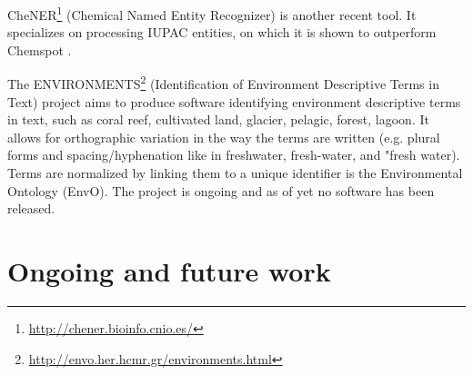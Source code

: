 \documentclass[11pt,oneside,a4paper]{report}
\begin{document}
CheNER\footnote{\url{http://chener.bioinfo.cnio.es/}} (Chemical Named Entity Recognizer) is another recent tool. It specializes on processing IUPAC entities, on which it is shown to outperform Chemspot \citep{Usie2014CheNER}.

The ENVIRONMENTS\footnote{\url{http://envo.her.hcmr.gr/environments.html}} (Identification of Environment Descriptive Terms in Text) project aims to produce software identifying environment descriptive terms in text, such as coral reef, cultivated land, glacier, pelagic, forest, lagoon.
It allows for orthographic variation in the way the terms are written (e.g. plural forms and spacing/hyphenation like in freshwater, fresh-water, and "fresh water).
Terms are normalized by linking them to a unique identifier is the Environmental Ontology (EnvO).
The project is ongoing and as of yet no software has been released.


\chapter{Ongoing and future work} 




\end{document}
